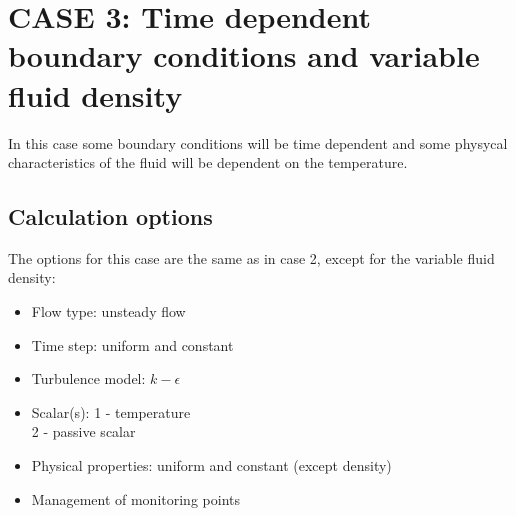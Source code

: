 %
%
%
%
%
%
%
\newpage
\section{CASE 3:  Time dependent boundary conditions and variable fluid density}
In this case some boundary conditions will be time dependent and some physycal
characteristics of the fluid will be dependent on the temperature.

        \subsection{Calculation options}

The options for this case are the same as in case 2, except for the variable fluid density:
\begin{itemize}
\renewcommand{\labelitemi}{$\rightarrow$}
        \item Flow type: unsteady flow
        \item Time step: uniform and constant
        \item Turbulence model: $k-\epsilon$
        \item Scalar(s): 1 - temperature\\
      \hspace*{1.6cm} 2 - passive scalar
        \item Physical properties: uniform and constant (except density)
        \item Management of monitoring points
\end{itemize}


